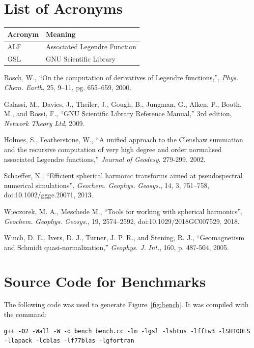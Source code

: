 \documentclass[12pt]{article}
\begin{document}
\section{List of Acronyms}

\begin{tabular}{@{}ll@{}}
\toprule
Acronym & Meaning \\
\midrule
ALF & Associated Legendre Function \\
GSL & GNU Scientific Library \\
\bottomrule
\end{tabular}


\begin{thebibliography}{10}

 Bosch, W., ``On the computation of derivatives of Legendre functions,'', \emph{Phys. Chem. Earth}, 25, 9--11, pg. 655--659, 2000.

 Galassi, M., Davies, J., Theiler, J., Gough, B., Jungman, G., Alken, P., Booth, M., and Rossi, F., ``GNU Scientific Library Reference Manual,'' 3rd edition, \emph{Network Theory Ltd}, 2009.

 Holmes, S., Featherstone, W., ``A unified approach to the Clenshaw summation and the recursive computation of very high degree and order normalised associated Legendre functions,'' \emph{Journal of Geodesy}, 279-299, 2002.

 Schaeffer, N., ``Efficient spherical harmonic transforms aimed at pseudospectral numerical simulations'', \emph{Geochem. Geophys. Geosys.}, 14, 3, 751--758, doi:10.1002/ggge.20071, 2013.

 Wieczorek, M. A., Meschede M., ``Tools for working with spherical harmonics'', \emph{Geochem. Geophys. Geosys.}, 19, 2574--2592, doi:10.1029/2018GC007529, 2018.

 Winch, D. E., Ivers, D. J., Turner, J. P. R., and Stening, R. J., ``Geomagnetism and Schmidt quasi-normalization,'' \emph{Geophys. J. Int.}, 160, p. 487-504, 2005.

\end{thebibliography}

\appendix

\section{Source Code for Benchmarks}
\label{sec:benchsrc}

The following code was used to generate Figure~\ref{fig:bench}. It was compiled with the
command:
\scriptsize
\begin{verbatim}
g++ -O2 -Wall -W -o bench bench.cc -lm -lgsl -lshtns -lfftw3 -lSHTOOLS -llapack -lcblas -lf77blas -lgfortran
\end{verbatim}


\end{document}
